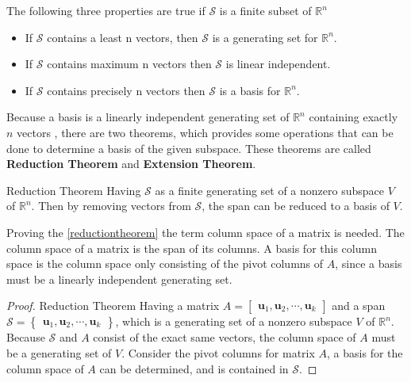 The following three properties are true if $\mathcal{S}$ is a finite subset of $\mathbb{R}^n$
\begin{itemize}
    \item If $\mathcal{S}$ contains a least n vectors, then $\mathcal{S}$ is a generating set for $\mathbb{R}^n$. 
    \item If $\mathcal{S}$ contains maximum n vectors then $\mathcal{S}$ is linear independent.
    \item If $\mathcal{S}$ contains precisely n vectors then $\mathcal{S}$ is a basis for $\mathbb{R}^n$.
\end{itemize}

Because a basis is a linearly independent generating set of $\mathbb{R}^n$ containing exactly $n$ vectors , there are two theorems, which provides some operations that can be done to determine a basis of the given subspace. These theorems are called \textbf{Reduction Theorem} and \textbf{Extension Theorem}.

\begin{theorem}{Reduction Theorem}
Having $\mathcal{S}$ as a finite generating set of a nonzero subspace $V$ of $\mathbb{R}^n$. Then by removing vectors from $\mathcal{S}$, the span can be reduced to a basis of $V$.
\cite[243]{LiAl}
\label{reductiontheorem}
\end{theorem}
Proving the \ref{reductiontheorem} the term column space of a matrix is needed. The column space of a matrix is the span of its columns. A basis for this column space is the column space only consisting of the pivot columns of $A$, since a basis must be a linearly independent generating set.

\begin{proof}{Reduction Theorem}
Having a matrix $A=\begin{bmatrix}
 \textbf{u}_1, \textbf{u}_2, \cdots, \textbf{u}_k
\end{bmatrix}$ and a span
$
\mathcal{S}=\begin{Bmatrix}
 \textbf{u}_1, \textbf{u}_2, \cdots, \textbf{u}_k
\end{Bmatrix}  
$, which is a generating set of a nonzero subspace $V$ of $\mathbb{R}^n$. Because $\mathcal{S}$ and $A$ consist of the exact same vectors, the column space of $A$ must be a generating set of $V$. Consider the pivot columns for matrix $A$, a basis for the column space of $A$ can be determined, and is contained in $\mathcal{S}$. \qedsymbol
\end{proof}




